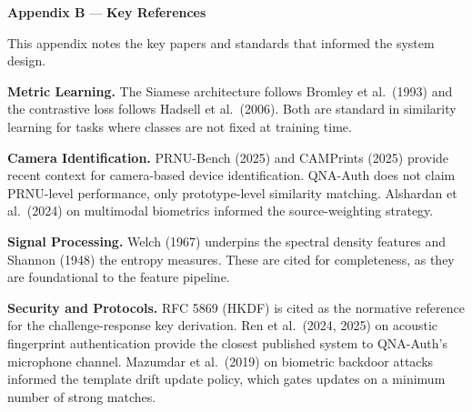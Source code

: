 \begin{center}
	{\Large \textbf{Appendix B}} --- \vspace*{0.5cm}
	{\Large \textbf{Key References}}
\end{center}

\vspace{0.3cm}
This appendix notes the key papers and standards that informed the system design.

\vspace{0.3cm}
\noindent\textbf{Metric Learning.} The Siamese architecture follows Bromley et al.\ (1993) and the contrastive loss follows Hadsell et al.\ (2006). Both are standard in similarity learning for tasks where classes are not fixed at training time.

\vspace{0.3cm}
\noindent\textbf{Camera Identification.} PRNU-Bench (2025) and CAMPrints (2025) provide recent context for camera-based device identification. QNA-Auth does not claim PRNU-level performance, only prototype-level similarity matching. Alshardan et al.\ (2024) on multimodal biometrics informed the source-weighting strategy.

\vspace{0.3cm}
\noindent\textbf{Signal Processing.} Welch (1967) underpins the spectral density features and Shannon (1948) the entropy measures. These are cited for completeness, as they are foundational to the feature pipeline.

\vspace{0.3cm}
\noindent\textbf{Security and Protocols.} RFC 5869 (HKDF) is cited as the normative reference for the challenge-response key derivation. Ren et al.\ (2024, 2025) on acoustic fingerprint authentication provide the closest published system to QNA-Auth's microphone channel. Mazumdar et al.\ (2019) on biometric backdoor attacks informed the template drift update policy, which gates updates on a minimum number of strong matches.
